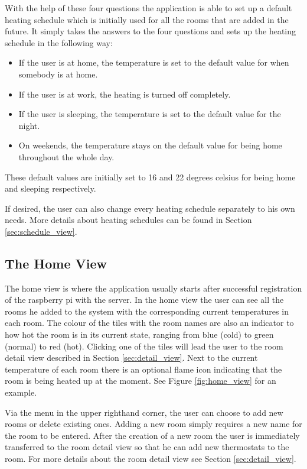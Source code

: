 With the help of these four questions the application is able to set up a default heating schedule which is initially used for all the rooms that are added in the future. It simply takes the answers to the four questions and sets up the heating schedule in the following way: 

\begin{itemize}
\item{If the user is at home, the temperature is set to the default value for when somebody is at home.}
\item{If the user is at work, the heating is turned off completely.}
\item{If the user is sleeping, the temperature is set to the default value for the night.}
\item{On weekends, the temperature stays on the default value for being home throughout the whole day.}
\end{itemize}

These default values are initially set to 16 and 22 degrees celsius for being home and sleeping respectively.

If desired, the user can also change every heating schedule separately to his own needs. More details about heating schedules can be found in Section \ref{sec:schedule_view}.

\subsection{The Home View}
\label{sec:home_view}
The home view is where the application usually starts after successful registration of the raspberry pi with the server. In the home view the user can see all the rooms he added to the system with the corresponding current temperatures in each room. The colour of the tiles with the room names are also an indicator to how hot the room is in its current state, ranging from blue (cold) to green (normal) to red (hot). Clicking one of the tiles will lead the user to the room detail view described in Section \ref{sec:detail_view}. Next to the current temperature of each room there is an optional flame icon indicating that the room is being heated up at the moment. See Figure \ref{fig:home_view} for an example.

Via the menu in the upper righthand corner, the user can choose to add new rooms or delete existing ones. Adding a new room simply requires a new name for the room to be entered. After the creation of a new room the user is immediately transferred to the room detail view so that he can add new thermostats to the room. For more details about the room detail view see Section \ref{sec:detail_view}.

